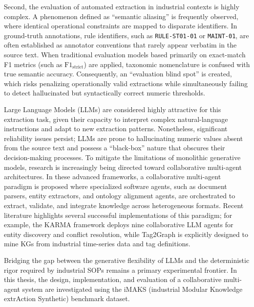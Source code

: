 ﻿\documentclass[11pt]{article}
\begin{document}
Second, the evaluation of automated extraction in industrial contexts is highly complex. A phenomenon defined as ``semantic aliasing'' is frequently observed, where identical operational constraints are mapped to disparate identifiers. In ground-truth annotations, rule identifiers, such as \texttt{RULE-ST01-01} or \texttt{MAINT-01}, are often established as annotator conventions that rarely appear verbatim in the source text. When traditional evaluation models based primarily on exact-match F1 metrics (such as $\text{F1}_{\text{strict}}$) are applied, taxonomic nomenclature is confused with true semantic accuracy. Consequently, an ``evaluation blind spot'' is created, which risks penalizing operationally valid extractions while simultaneously failing to detect hallucinated but syntactically correct numeric thresholds.

Large Language Models (LLMs) are considered highly attractive for this extraction task, given their capacity to interpret complex natural-language instructions and adapt to new extraction patterns. Nonetheless, significant reliability issues persist; LLMs are prone to hallucinating numeric values absent from the source text and possess a ``black-box'' nature that obscures their decision-making processes. To mitigate the limitations of monolithic generative models, research is increasingly being directed toward collaborative multi-agent architectures. In these advanced frameworks, a collaborative multi-agent paradigm is proposed where specialized software agents, such as document parsers, entity extractors, and ontology alignment agents, are orchestrated to extract, validate, and integrate knowledge across heterogeneous formats. Recent literature highlights several successful implementations of this paradigm; for example, the KARMA framework deploys nine collaborative LLM agents for entity discovery and conflict resolution, while Tag2Graph is explicitly designed to mine KGs from industrial time-series data and tag definitions. 

Bridging the gap between the generative flexibility of LLMs and the deterministic rigor required by industrial SOPs remains a primary experimental frontier. In this thesis, the design, implementation, and evaluation of a collaborative multi-agent system are investigated using the iMAKS (industrial Modular Knowledge extrAction Synthetic) benchmark dataset.

\end{document}
